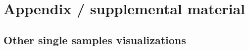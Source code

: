 \appendix

\section{Appendix / supplemental material}

\subsection{Other single samples visualizations}



